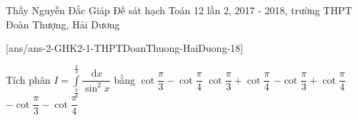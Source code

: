 \begin{name}
{Thầy Nguyễn Đắc Giáp}
{Đề sát hạch Toán 12 lần 2, 2017 - 2018, trường THPT Đoàn Thượng, Hải Dương}
\end{name}
\setcounter{ex}{0}
[ans/ans-2-GHK2-1-THPTDoanThuong-HaiDuong-18]
\begin{ex}%
	Tích phân $I=\displaystyle\int\limits_{\tfrac{\pi}{4}}^{\tfrac{\pi}{3}} {{\dfrac{\mathrm{\,d}x}{\sin^2x}}}$ bằng
	\choice
	{$\cot \dfrac{\pi}{3}-\cot \dfrac{\pi}{4}$}
	{$\cot \dfrac{\pi}{3}+\cot \dfrac{\pi}{4}$}
	{\True $-\cot \dfrac{\pi}{3}+\cot \dfrac{\pi}{4}$}
	{$-\cot \dfrac{\pi}{3}-\cot \dfrac{\pi}{4}$}
	\loigiai{
		\[I=\displaystyle\int\limits_{\tfrac{\pi}{4}}^{\tfrac{\pi}{3}} {{\dfrac{\mathrm{\,d}x}{{\sin}^2x}}}={-\cot x}\bigg|_{\tfrac{\pi}{4}}^{\tfrac{\pi}{3}}=-\left({\cot \dfrac{\pi}{3}-\cot \dfrac{\pi}{4}}\right)=-\cot \dfrac{\pi}{3}+\cot \dfrac{\pi}{4}.\]
	}
\end{ex}

